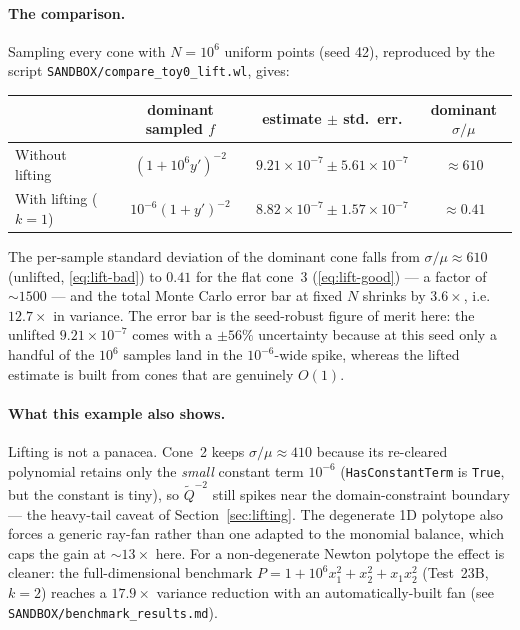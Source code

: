 \documentclass[11pt,a4paper]{article}
\begin{document}
\paragraph{The comparison.} Sampling every cone with $N=10^6$ uniform points
(seed 42), reproduced by the script \texttt{SANDBOX/compare\_toy0\_lift.wl},
gives:

\begin{center}
\setlength{\tabcolsep}{5pt}
\begin{tabular}{lccc}
\toprule
 & dominant sampled $f$ & estimate $\pm$ std.\ err. & dominant $\sigma/\mu$ \\
\midrule
Without lifting        & $(1+10^6 y')^{-2}$  & $9.21\times10^{-7} \pm 5.61\times10^{-7}$ & $\approx 610$ \\
With lifting ($k{=}1$) & $10^{-6}(1+y')^{-2}$ & $8.82\times10^{-7} \pm 1.57\times10^{-7}$ & $\approx 0.41$ \\
\bottomrule
\end{tabular}
\end{center}

The per-sample standard deviation of the dominant cone falls from
$\sigma/\mu\approx 610$ (unlifted, \eqref{eq:lift-bad}) to $0.41$ for the flat
cone~3 (\eqref{eq:lift-good}) --- a factor of $\sim\!1500$ --- and the total
Monte Carlo error bar at fixed $N$ shrinks by $3.6\times$, i.e.\ $12.7\times$ in
variance. The error bar is the seed-robust figure of merit here: the unlifted
$9.21\times10^{-7}$ comes with a $\pm 56\%$ uncertainty because at this seed only
a handful of the $10^6$ samples land in the $10^{-6}$-wide spike, whereas the
lifted estimate is built from cones that are genuinely $O(1)$.

\paragraph{What this example also shows.} Lifting is not a panacea. Cone~2 keeps
$\sigma/\mu\approx 410$ because its re-cleared polynomial retains only the
\emph{small} constant term $10^{-6}$ (\texttt{HasConstantTerm} is \texttt{True},
but the constant is tiny), so $\tilde Q^{-2}$ still spikes near the
domain-constraint boundary --- the heavy-tail caveat of
Section~\ref{sec:lifting}. The degenerate 1D polytope also forces a generic
ray-fan rather than one adapted to the monomial balance, which caps the gain at
$\sim\!13\times$ here. For a non-degenerate Newton polytope the effect is
cleaner: the full-dimensional benchmark $P = 1 + 10^6 x_1^2 + x_2^2 + x_1 x_2^2$
(Test~23B, $k=2$) reaches a $17.9\times$ variance reduction with an
automatically-built fan (see \texttt{SANDBOX/benchmark\_results.md}).
\end{document}
